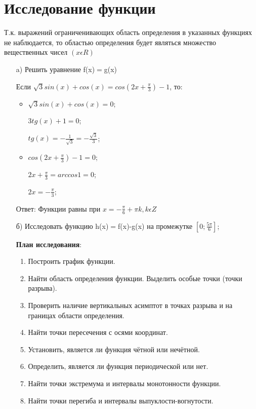 \documentclass[russian,utf8,nocolumnxxxi,nocolumnxxxii]{eskdtext}
\begin{document}
\newpage
\section{Исследование функции}

Т.к. выражений ограниченивающих область определения в указанных функциях не наблюдается, то областью определения будет являться множество вещественных чисел $(x \epsilon R)$
\begin{enumerate}
    \item[a)]Решить уравнение f(x)$=$g(x)
    
   Если $\sqrt{3}sin(x)+cos(x)=cos(2x+\frac{\pi}{3})-1$,
   то:
   \begin{itemize}
   \renewcommand{\labelitemi}{$\bullet$}
       \item $\sqrt{3}sin(x)+cos(x)=0$;
       
       $3tg(x)+1=0$;
       
       $tg(x)=-\frac{1}{\sqrt{3}}=-\frac{\sqrt{3}}{3}$;
       
       \item $cos(2x+\frac{\pi}{3})-1=0$;
       
       $2x+\frac{\pi}{3}=arccos 1=0$;
       
       $2x=-\frac{\pi}{3}$;

   \end{itemize}
   
 Ответ: Функции равны при $x=-\frac{\pi}{6}+\pi k,  k \epsilon Z$
    
    \item[б)] Исследовать функцию h(x)$=$f(x)-g(x) на промежутке $[0;\frac{5\pi}{6}]$;
    
        \textbf{План исследования}:
    \begin{enumerate}
        \item Построить график функции.
        \item Найти область определения функции. Выделить особые точки (точки разрыва). 
        \item Проверить наличие вертикальных асимптот в точках разрыва и на границах области
определения.
        \item Найти точки пересечения с осями координат.
        \item Установить, является ли функция чётной или нечётной.
        \item Определить, является ли функция периодической или нет. 
        \item Найти точки экстремума и интервалы монотонности функции.
        \item Найти точки перегиба и интервалы выпуклости-вогнутости.
         

\end{enumerate}
\end{enumerate}
\end{document}

